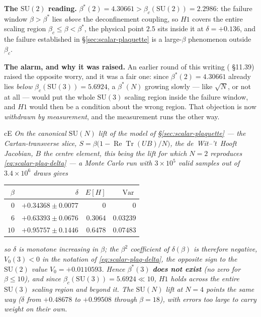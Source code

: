 \textbf{The $\mathrm{SU}(2)$ reading.} $\beta^*(2)=4.30661>\beta_c(\mathrm{SU}(2))=2.2986$: the
failure window $\beta>\beta^*$ lies \emph{above} the deconfinement coupling, so $H1$ covers the
entire scaling region $\beta_c\le\beta<\beta^*$, the physical point $2.5$ sits inside it at
$\delta=+0.136$, and the failure established in \S\ref{sec:scalar-plaquette} is a large-$\beta$
phenomenon outside $\beta_c$.

\textbf{The alarm, and why it was raised.} An earlier round of this writing
( \S11.39) raised the opposite worry, and it was a fair one: since
$\beta^*(2)=4.30661$ already lies \emph{below} $\beta_c(\mathrm{SU}(3))=5.6924$, a $\beta^*(N)$
growing slowly --- like $\sqrt N$, or not at all --- would put the whole $\mathrm{SU}(3)$ scaling
region inside the failure window, and $H1$ would then be a condition about the wrong region. That
objection is now \emph{withdrawn by measurement}, and the measurement runs the other way.

\begin{claimbox}{cE}
 \emph{On the canonical $\mathrm{SU}(N)$ lift of
the model of \S\ref{sec:scalar-plaquette} --- the Cartan-transverse slice, $S=\beta\bigl(1-
\operatorname{Re}\operatorname{Tr}(UB)/N\bigr)$, the de~Wit--'t~Hooft Jacobian, $B$ the centre
element, this being the lift for which $N=2$ reproduces
\eqref{eq:scalar-plaq-delta} --- a Monte Carlo run with $3\times10^{5}$ valid samples out of
$3.4\times10^{6}$ draws gives}
\begin{center}
\footnotesize
\begin{tabular}{@{}rrrr@{}}
\toprule
$\beta$ & $\delta$ & $E[H]$ & $\operatorname{Var}$\\
\midrule
$0$  & $+0.34368\pm0.0077$ & $0$ & $0$\\
$6$  & $+0.63393\pm0.0676$ & $0.3064$ & $0.03239$\\
$10$ & $+0.95757\pm0.1446$ & $0.6478$ & $0.07483$\\
\bottomrule
\end{tabular}
\end{center}
\emph{so $\delta$ is monotone \emph{increasing} in $\beta$; the $\beta^2$ coefficient of
$\delta(\beta)$ is therefore negative, $V_0(3)<0$ in the notation of
\eqref{eq:scalar-plaq-delta}, the opposite sign to the $\mathrm{SU}(2)$ value
$V_0=+0.0110593$. Hence $\beta^*(3)$ \textbf{does not exist} (no zero for $\beta\le10$), and since
$\beta_c(\mathrm{SU}(3))=5.6924\ll10$, $H1$ holds across the \emph{entire} $\mathrm{SU}(3)$
scaling region and beyond it. The $\mathrm{SU}(N)$ lift at $N=4$ points the same way ($\delta$ from
$+0.48678$ to $+0.99508$ through $\beta=18$), with errors too large to carry weight on their own.}
\LE{}
\end{claimbox}


